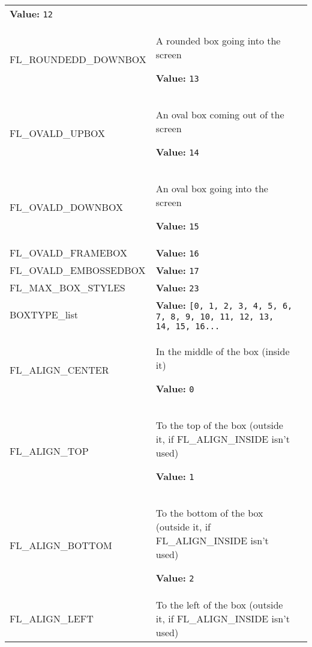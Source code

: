 \begin{longtable}{|p{\varnamewidth}|p{\vardescrwidth}|l}
\textbf{Value:} 
{\tt 12}&\\
\cline{1-2}
\raggedright F\-L\-\_\-R\-O\-U\-N\-D\-E\-D\-3\-D\-\_\-D\-O\-W\-N\-B\-O\-X\- & \raggedright A rounded box going into the screen

\textbf{Value:} 
{\tt 13}&\\
\cline{1-2}
\raggedright F\-L\-\_\-O\-V\-A\-L\-3\-D\-\_\-U\-P\-B\-O\-X\- & \raggedright An oval box coming out of the screen

\textbf{Value:} 
{\tt 14}&\\
\cline{1-2}
\raggedright F\-L\-\_\-O\-V\-A\-L\-3\-D\-\_\-D\-O\-W\-N\-B\-O\-X\- & \raggedright An oval box going into the screen

\textbf{Value:} 
{\tt 15}&\\
\cline{1-2}
\raggedright F\-L\-\_\-O\-V\-A\-L\-3\-D\-\_\-F\-R\-A\-M\-E\-B\-O\-X\- & \raggedright \textbf{Value:} 
{\tt 16}&\\
\cline{1-2}
\raggedright F\-L\-\_\-O\-V\-A\-L\-3\-D\-\_\-E\-M\-B\-O\-S\-S\-E\-D\-B\-O\-X\- & \raggedright \textbf{Value:} 
{\tt 17}&\\
\cline{1-2}
\raggedright F\-L\-\_\-M\-A\-X\-\_\-B\-O\-X\-\_\-S\-T\-Y\-L\-E\-S\- & \raggedright \textbf{Value:} 
{\tt 23}&\\
\cline{1-2}
\raggedright B\-O\-X\-T\-Y\-P\-E\-\_\-l\-i\-s\-t\- & \raggedright \textbf{Value:} 
{\tt \texttt{[}0\texttt{, }1\texttt{, }2\texttt{, }3\texttt{, }4\texttt{, }5\texttt{, }6\texttt{, }7\texttt{, }8\texttt{, }9\texttt{, }10\texttt{, }11\texttt{, }12\texttt{, }13\texttt{, }14\texttt{, }15\texttt{, }16\texttt{...}}&\\
\cline{1-2}
\raggedright F\-L\-\_\-A\-L\-I\-G\-N\-\_\-C\-E\-N\-T\-E\-R\- & \raggedright In the middle of the box (inside it)

\textbf{Value:} 
{\tt 0}&\\
\cline{1-2}
\raggedright F\-L\-\_\-A\-L\-I\-G\-N\-\_\-T\-O\-P\- & \raggedright To the top of the box (outside it, if FL\_ALIGN\_INSIDE isn't 
          used)

\textbf{Value:} 
{\tt 1}&\\
\cline{1-2}
\raggedright F\-L\-\_\-A\-L\-I\-G\-N\-\_\-B\-O\-T\-T\-O\-M\- & \raggedright To the bottom of the box (outside it, if FL\_ALIGN\_INSIDE isn't 
          used)

\textbf{Value:} 
{\tt 2}&\\
\cline{1-2}
\raggedright F\-L\-\_\-A\-L\-I\-G\-N\-\_\-L\-E\-F\-T\- & \raggedright To the left of the box (outside it, if FL\_ALIGN\_INSIDE isn't 
          used)


\end{longtable}
